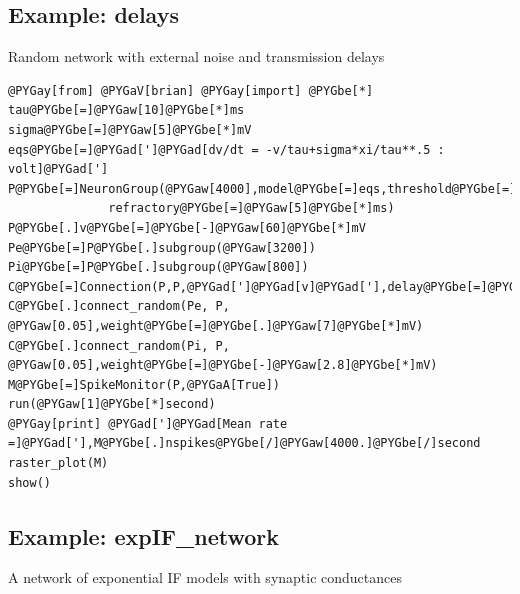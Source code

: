 \documentclass[letterpaper,10pt]{manual}
\begin{document}
\resetcurrentobjects
{}

\hypertarget{index-32}{}\subsection{Example: delays}

Random network with external noise and transmission delays

\begin{Verbatim}[commandchars=@\[\]]
@PYGay[from] @PYGaV[brian] @PYGay[import] @PYGbe[*]
tau@PYGbe[=]@PYGaw[10]@PYGbe[*]ms
sigma@PYGbe[=]@PYGaw[5]@PYGbe[*]mV
eqs@PYGbe[=]@PYGad[']@PYGad[dv/dt = -v/tau+sigma*xi/tau**.5 : volt]@PYGad[']
P@PYGbe[=]NeuronGroup(@PYGaw[4000],model@PYGbe[=]eqs,threshold@PYGbe[=]@PYGaw[10]@PYGbe[*]mV,reset@PYGbe[=]@PYGaw[0]@PYGbe[*]mV,\
              refractory@PYGbe[=]@PYGaw[5]@PYGbe[*]ms)
P@PYGbe[.]v@PYGbe[=]@PYGbe[-]@PYGaw[60]@PYGbe[*]mV
Pe@PYGbe[=]P@PYGbe[.]subgroup(@PYGaw[3200])
Pi@PYGbe[=]P@PYGbe[.]subgroup(@PYGaw[800])
C@PYGbe[=]Connection(P,P,@PYGad[']@PYGad[v]@PYGad['],delay@PYGbe[=]@PYGaw[2]@PYGbe[*]ms)
C@PYGbe[.]connect_random(Pe, P, @PYGaw[0.05],weight@PYGbe[=]@PYGbe[.]@PYGaw[7]@PYGbe[*]mV)
C@PYGbe[.]connect_random(Pi, P, @PYGaw[0.05],weight@PYGbe[=]@PYGbe[-]@PYGaw[2.8]@PYGbe[*]mV)
M@PYGbe[=]SpikeMonitor(P,@PYGaA[True])
run(@PYGaw[1]@PYGbe[*]second)
@PYGay[print] @PYGad[']@PYGad[Mean rate =]@PYGad['],M@PYGbe[.]nspikes@PYGbe[/]@PYGaw[4000.]@PYGbe[/]second
raster_plot(M)
show()
\end{Verbatim}

\resetcurrentobjects
{}

\hypertarget{index-33}{}\subsection{Example: expIF\_network}

A network of exponential IF models with synaptic conductances
\end{document}
